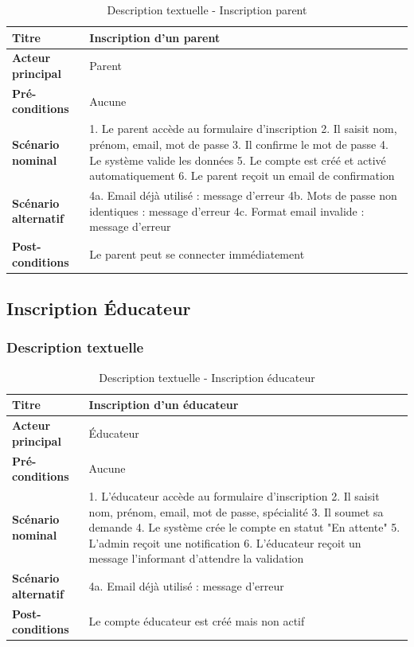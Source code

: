 \documentclass[12pt,a4paper]{report}
\begin{document}
\begin{table}[h]
\centering
\begin{tabular}{|p{4cm}|p{10cm}|}
\hline
\textbf{Titre} & Inscription d'un parent \\
\hline
\textbf{Acteur principal} & Parent \\
\hline
\textbf{Pré-conditions} & Aucune \\
\hline
\textbf{Scénario nominal} & 
1. Le parent accède au formulaire d'inscription
2. Il saisit nom, prénom, email, mot de passe
3. Il confirme le mot de passe
4. Le système valide les données
5. Le compte est créé et activé automatiquement
6. Le parent reçoit un email de confirmation \\
\hline
\textbf{Scénario alternatif} & 
4a. Email déjà utilisé : message d'erreur
4b. Mots de passe non identiques : message d'erreur
4c. Format email invalide : message d'erreur \\
\hline
\textbf{Post-conditions} & Le parent peut se connecter immédiatement \\
\hline
\end{tabular}
\caption{Description textuelle - Inscription parent}
\end{table}

\subsection{Inscription Éducateur}

\subsubsection{Description textuelle}

\begin{table}[h]
\centering
\begin{tabular}{|p{4cm}|p{10cm}|}
\hline
\textbf{Titre} & Inscription d'un éducateur \\
\hline
\textbf{Acteur principal} & Éducateur \\
\hline
\textbf{Pré-conditions} & Aucune \\
\hline
\textbf{Scénario nominal} & 
1. L'éducateur accède au formulaire d'inscription
2. Il saisit nom, prénom, email, mot de passe, spécialité
3. Il soumet sa demande
4. Le système crée le compte en statut "En attente"
5. L'admin reçoit une notification
6. L'éducateur reçoit un message l'informant d'attendre la validation \\
\hline
\textbf{Scénario alternatif} & 
4a. Email déjà utilisé : message d'erreur \\
\hline
\textbf{Post-conditions} & Le compte éducateur est créé mais non actif \\
\hline
\end{tabular}
\caption{Description textuelle - Inscription éducateur}
\end{table}
\end{document}
